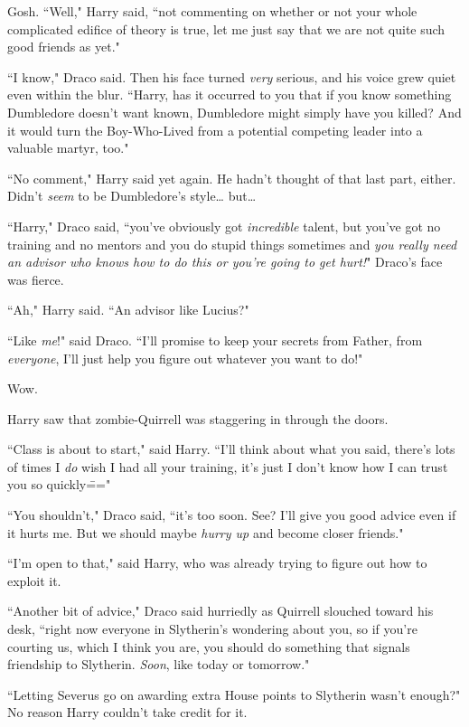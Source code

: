 Gosh. ``Well," Harry said, ``not commenting on whether or not your whole complicated edifice of theory is true, let me just say that we are not quite such good friends as yet."

``I know," Draco said. Then his face turned \emph{very} serious, and his voice grew quiet even within the blur. ``Harry, has it occurred to you that if you know something Dumbledore doesn't want known, Dumbledore might simply have you killed? And it would turn the Boy-Who-Lived from a potential competing leader into a valuable martyr, too."

``No comment," Harry said yet again. He hadn't thought of that last part, either. Didn't \emph{seem} to be Dumbledore's style{\ldots} but{\ldots}

``Harry," Draco said, ``you've obviously got \emph{incredible} talent, but you've got no training and no mentors and you do stupid things sometimes and \emph{you really need an advisor who knows how to do this or you're going to get hurt!}" Draco's face was fierce.

``Ah," Harry said. ``An advisor like Lucius?"

``Like \emph{me}!" said Draco. ``I'll promise to keep your secrets from Father, from \emph{everyone}, I'll just help you figure out whatever you want to do!"

Wow.

Harry saw that zombie-Quirrell was staggering in through the doors.

``Class is about to start," said Harry. ``I'll think about what you said, there's lots of times I \emph{do} wish I had all your training, it's just I don't know how I can trust you so quickly\==="

``You shouldn't," Draco said, ``it's too soon. See? I'll give you good advice even if it hurts me. But we should maybe \emph{hurry up} and become closer friends."

``I'm open to that," said Harry, who was already trying to figure out how to exploit it.

``Another bit of advice," Draco said hurriedly as Quirrell slouched toward his desk, ``right now everyone in Slytherin's wondering about you, so if you're courting us, which I think you are, you should do something that signals friendship to Slytherin. \emph{Soon}, like today or tomorrow."

``Letting Severus go on awarding extra House points to Slytherin wasn't enough?" No reason Harry couldn't take credit for it.

